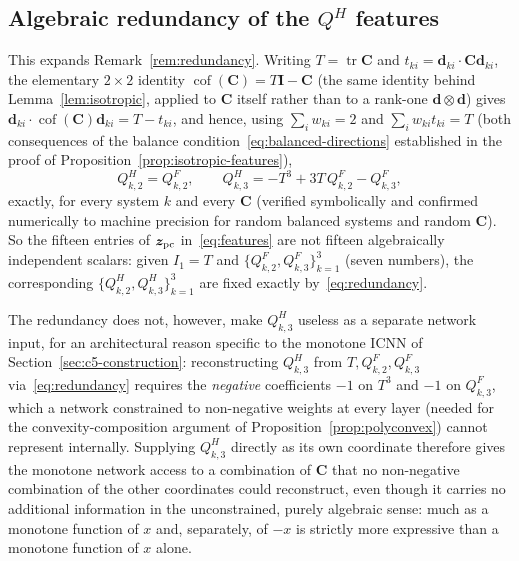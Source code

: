 \documentclass[10pt,a4paper]{article}
\newcommand{\Cof}{\operatorname{cof}}
\newcommand{\tr}{\operatorname{tr}}
\begin{document}
\subsection{Algebraic redundancy of the \texorpdfstring{$Q^H$}{Q\^{}H} features}
\label{app:redundancy}
This expands Remark~\ref{rem:redundancy}. Writing $T=\tr \bm C$ and
$t_{ki}=\bm d_{ki}\cdot \bm C\bm d_{ki}$, the elementary $2\times2$
identity $\Cof(\bm C)=T\bm I-\bm C$ (the same identity behind
Lemma~\ref{lem:isotropic}, applied to $\bm C$ itself rather than to a
rank-one $\bm d\otimes\bm d$) gives $\bm d_{ki}\cdot\Cof(\bm C)\bm
d_{ki}=T-t_{ki}$, and hence, using $\sum_iw_{ki}=2$ and
$\sum_iw_{ki}t_{ki}=T$ (both consequences of the balance
condition~\eqref{eq:balanced-directions} established in the proof of
Proposition~\ref{prop:isotropic-features}),
\begin{equation}
 Q_{k,2}^H=Q_{k,2}^F,\qquad
 Q_{k,3}^H=-T^3+3T\,Q_{k,2}^F-Q_{k,3}^F,
 \label{eq:redundancy}
\end{equation}
exactly, for every system $k$ and every $\bm C$ (verified symbolically and
confirmed numerically to machine precision for random balanced systems
and random $\bm C$). So the fifteen entries of $\bm z_{\rm pc}$
in~\eqref{eq:features} are not fifteen algebraically independent
scalars: given $I_1=T$ and $\{Q_{k,2}^F,Q_{k,3}^F\}_{k=1}^3$ (seven
numbers), the corresponding $\{Q_{k,2}^H,Q_{k,3}^H\}_{k=1}^3$ are fixed
exactly by~\eqref{eq:redundancy}.

The redundancy does not, however, make $Q_{k,3}^H$ useless as a
separate network input, for an architectural reason specific to the
monotone ICNN of Section~\ref{sec:c5-construction}: reconstructing
$Q_{k,3}^H$ from $T,Q_{k,2}^F,Q_{k,3}^F$ via~\eqref{eq:redundancy}
requires the \emph{negative} coefficients $-1$ on $T^3$ and $-1$ on
$Q_{k,3}^F$, which a network constrained to non-negative weights at
every layer (needed for the convexity-composition argument of
Proposition~\ref{prop:polyconvex}) cannot represent internally.
Supplying $Q_{k,3}^H$ directly as its own coordinate therefore gives
the monotone network access to a combination of $\bm C$ that no
non-negative combination of the other coordinates could reconstruct,
even though it carries no additional information in the
unconstrained, purely algebraic sense: much as a monotone function of
$x$ and, separately, of $-x$ is strictly more expressive than a
monotone function of $x$ alone.
\end{document}
